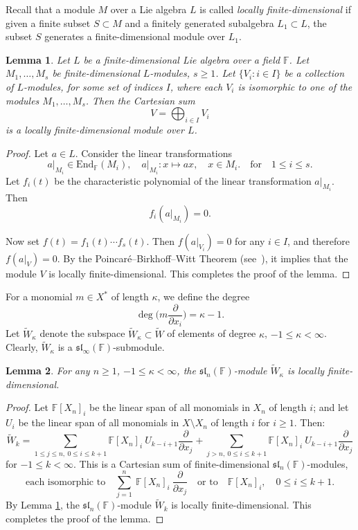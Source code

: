 \documentclass[12pt,a4paper]{amsart}
\theoremstyle{plain}
\newtheorem{Lemma}{Lemma}
\begin{document}
	Recall that a module $M$ over a Lie algebra $L$ is called \textit{locally finite-dimensional} if given a finite subset $S \subset M$ and a finitely generated subalgebra $L_1 \subset L$, the subset $S$ generates a finite-dimensional module over $L_1$.
	
	
	\begin{Lemma}\label{Lemma1} Let $L$ be a finite-dimensional Lie algebra over a field $\mathbb{F}$. Let $M_1, \dots, M_s$ be finite-dimensional $L$-modules, $s \geq 1$. Let $\{V_i: i \in I\}$ be a collection of $L$-modules, for some set of indices $I$, where each $V_i$ is isomorphic to one of the modules $M_1, \dots, M_s$. Then the Cartesian sum
		\[
		V = \bigoplus_{i \in I} V_i
		\]
		is a locally finite-dimensional module over $L$. \end{Lemma}
	
	
	\begin{proof} Let $a \in L$. Consider the linear transformations
		\[
		a\big|_{M_i} \in \text{End}_{\mathbb{F}}(M_i), \quad a\big|_{M_i}: x \mapsto ax, \quad x \in M_i.
	 \quad \text{for} \quad 1 \leq i \leq s.	\] Let $f_i(t)$ be the characteristic polynomial of the linear transformation $a|_{M_i}$. Then
		\[
		f_i(a|_{M_i}) = 0.
		\]
		
		Now set \( f(t) = f_1(t)\cdots f_s(t) \). Then $f(a\big|_{V_i}) = 0$ for any $i \in I$, and therefore $f(a\big|_V) = 0$. By the Poincaré–Birkhoff–Witt Theorem (see~\cite{Jacobson_PBW}), it implies that the module $V$ is locally finite-dimensional. This completes the proof of the lemma. \end{proof}
	
	For a monomial $m \in X^*$ of length $\kappa$, we define the degree $$\deg\Big(m \frac{\partial}{\partial x_i}\Big) = \kappa - 1.$$ Let $\widetilde{W}_\kappa$ denote the subspace $\widetilde{W}_\kappa \subset \widetilde{W}$ of elements of degree $\kappa$, $-1 \leq \kappa < \infty$. Clearly, $\widetilde{W}_\kappa$ is a $\mathfrak{sl}_{\infty}(\mathbb{F})$-submodule.
	
	\begin{Lemma}\label{Lemma2} For any $n \geq 1$, $-1 \leq \kappa < \infty$, the $\mathfrak{sl}_n(\mathbb{F})$-module $\widetilde{W}_\kappa$ is locally finite-dimensional. \end{Lemma}
	
	
	\begin{proof} Let $\mathbb{F}[X_n]_i$ be the linear span of all monomials in $X_n$ of length $i$; and let $U_i$ be the linear span of all monomials in $X \setminus X_n$ of length $i$ for $i\geq 1$. Then:
		\[
		\widetilde{W}_k = \sum_{1\leq j\leq n, \ 0 \leq i \leq k+1} \mathbb{F}[X_n]_i \ U_{k-i+1} \frac{\partial}{\partial x_j} + \sum_{j>n, \ 0 \leq i \leq k+1} \mathbb{F}[X_n]_i \ U_{k-i+1} \frac{\partial}{\partial x_j}
		\] for $-1 \leq k < \infty .$ This is a Cartesian sum of finite-dimensional $\mathfrak{sl}_n(\mathbb{F})$-modules,  $$\text{each isomorphic to} \quad \sum_{j=1}^{n} \ \mathbb{F}[X_n]_i \ \frac{\partial}{\partial x_j} \quad \text{or to} \quad \mathbb{F}[X_n]_i, \quad 0 \leq i \leq k+1.$$ By Lemma \ref{Lemma1}, the $\mathfrak{sl}_n(\mathbb{F})$-module $\widetilde{W}_k$ is locally finite-dimensional. This completes the proof of the lemma. \end{proof}
	
\end{document}
